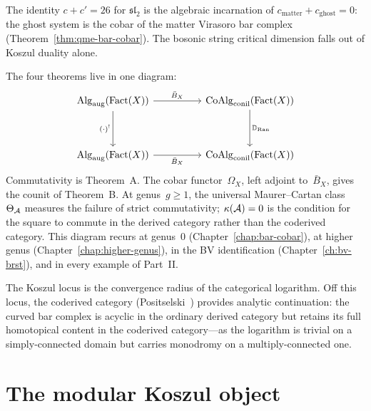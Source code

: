 \begin{remark}\label{rem:bosonic-string-26}
The identity $c + c' = 26$ for $\mathfrak{sl}_2$ is the algebraic
incarnation of $c_{\mathrm{matter}} + c_{\mathrm{ghost}} = 0$:
the ghost system is the cobar of the matter Virasoro bar complex
(Theorem~\ref{thm:qme-bar-cobar}).  The bosonic string critical
dimension falls out of Koszul duality alone.
\end{remark}

\medskip

The four theorems live in one diagram:
\begin{equation}\label{eq:master-square}
\begin{tikzcd}[row sep=huge, column sep=huge]
\operatorname{Alg}_{\mathrm{aug}}(\operatorname{Fact}(X))
  \arrow[r, "\bar{B}_X"]
  \arrow[d, "(\cdot)^!"']
& \operatorname{CoAlg}_{\mathrm{conil}}(\operatorname{Fact}(X))
  \arrow[d, "\mathbb{D}_{\operatorname{Ran}}"]
\\
\operatorname{Alg}_{\mathrm{aug}}(\operatorname{Fact}(X))
  \arrow[r, "\bar{B}_X"']
& \operatorname{CoAlg}_{\mathrm{conil}}(\operatorname{Fact}(X))
\end{tikzcd}
\end{equation}
Commutativity is Theorem~A\@.  The cobar functor~$\Omega_X$, left
adjoint to~$\bar{B}_X$, gives the counit of Theorem~B\@.  At
genus~$g \geq 1$, the universal Maurer--Cartan class~$\Theta_{\mathcal{A}}$
measures the failure of strict commutativity; $\kappa(\mathcal{A}) = 0$ is
the condition for the square to commute in the derived category
rather than the coderived category.  This diagram recurs at
genus~$0$ (Chapter~\ref{chap:bar-cobar}), at higher genus
(Chapter~\ref{chap:higher-genus}), in the BV identification
(Chapter~\ref{ch:bv-brst}), and in every example of
Part~\textup{II}.

The Koszul locus is the convergence radius of the categorical
logarithm.  Off this locus, the coderived category
(Positselski~\cite{Positselski11}) provides analytic continuation:
the curved bar complex is acyclic in the ordinary derived category
but retains its full homotopical content in the coderived
category---as the logarithm is trivial on a simply-connected domain
but carries monodromy on a multiply-connected one.

\section{The modular Koszul object}

